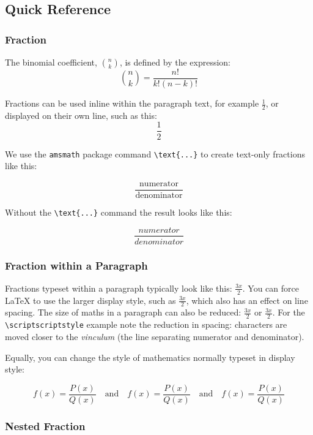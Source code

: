 \documentclass{article}
\theoremstyle{definition}
\theoremstyle{remark}
\begin{document}
\subsection{Quick Reference}
\subsubsection{Fraction}



The binomial coefficient, \(\binom{n}{k}\), is defined by the expression:
\[
    \binom{n}{k} = \frac{n!}{k!(n-k)!}
\]


Fractions can be used inline within the paragraph text, for 
example $\frac{1}{2}$, or displayed on their own line, 
such as this:
$$\frac{1}{2}$$



We use the \texttt{amsmath} package command
\verb|\text{...}| to create text-only fractions
like this:

$$\frac{\text{numerator}}{\text{denominator}}$$

Without the \verb|\text{...}| command the result 
looks like this:

$$\frac{numerator}{denominator}$$



\subsubsection{Fraction within a Paragraph}

Fractions typeset within a paragraph typically look like this: \(\frac{3x}{2}\). You can force \LaTeX{} to use the larger display style, such as \( \displaystyle \frac{3x}{2} \), which also has an effect on line spacing. The size of maths in a paragraph can also be reduced: \(\scriptstyle \frac{3x}{2}\) or \(\scriptscriptstyle \frac{3x}{2}\). For the \verb|\scriptscriptstyle| example note the reduction in spacing: characters are moved closer to the \textit{vinculum} (the line separating numerator and denominator).

Equally, you can change the style of mathematics normally typeset in display style:

\[f(x)=\frac{P(x)}{Q(x)}\quad \textrm{and}\quad \textstyle f(x)=\frac{P(x)}{Q(x)}\quad \textrm{and}\quad \scriptstyle f(x)=\frac{P(x)}{Q(x)}\]



\subsubsection{Nested Fraction}
\end{document}
